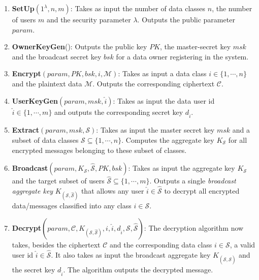 \begin{enumerate}
 \item \textbf{SetUp}$(1^{\lambda},n,m)$: Takes as input the number of data classes $n$, the number of users $m$ and the security parameter $\lambda$. Outputs the public parameter $param$. 
 
 \item \textbf{OwnerKeyGen}(): Outputs the public key $PK$, the master-secret key $msk$ and the broadcast secret key $bsk$ for a data owner registering in the system. 
 
 \item \textbf{Encrypt}$(param,PK,bsk,i,\mathcal{M})$: Takes as input a data class $i\in\{1,\cdots,n\}$ and the plaintext data $\mathcal{M}$. Outputs the corresponding ciphertext $\mathcal{C}$. 
 
 \item\textbf{UserKeyGen}$(param,msk,\hat{i})$: Takes as input the data user id $\hat{i}\in\{1,\cdots,m\}$ and outputs the corresponding secret key $d_{\hat{i}}$. 
 
 \item \textbf{Extract}$(param,msk,\mathcal{S})$: Takes as input the master secret key $msk$ and a subset of data classes $\mathcal{S} \subseteq\{1,\cdots,n\}$. Computes the aggregate key $K_{\mathcal{S}}$ for all encrypted messages belonging to these subset of classes.
 
 \item\textbf{Broadcast}$(param,K_{\mathcal{S}},\hat{\mathcal{S}},PK,bsk)$: Takes as input the aggregate key $K_{\mathcal{S}}$ and the target subset of users $\hat{\mathcal{S}}\subseteq\{1,\cdots,m\}$. Outputs a single \emph{broadcast aggregate key} $K_{\left(\mathcal{S},\hat{\mathcal{S}}\right)}$ that allows any user $\hat{i}\in\hat{\mathcal{S}}$ to decrypt all encrypted data/messages classified into any class $i\in\mathcal{S}$.

 \item\textbf{Decrypt}$(param,\mathcal{C},K_{\left(\mathcal{S},\hat{\mathcal{S}}\right)},i,\hat{i},d_{\hat{i}},\mathcal{S},\hat{\mathcal{S}})$: The decryption algorithm now takes, besides the ciphertext $\mathcal{C}$ and the corresponding data class $i\in\mathcal{S}$, a valid user id $\hat{i}\in\hat{\mathcal{S}}$. It also takes as input the broadcast aggregate key $K_{\left(\mathcal{S},\hat{\mathcal{S}}\right)}$ and the secret key $d_{\hat{i}}$. The algorithm outputs the decrypted message.

\end{enumerate}


